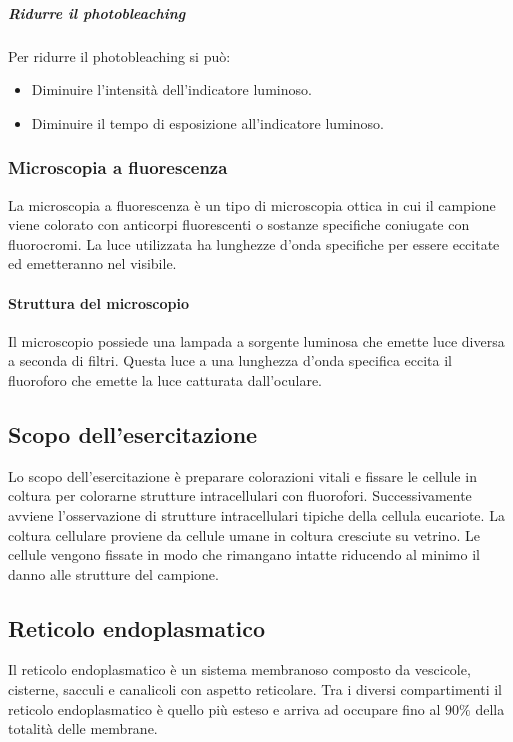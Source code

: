 				\subparagraph{Ridurre il photobleaching}
				Per ridurre il photobleaching si pu\`o:
				\begin{itemize}
					\item Diminuire l'intensit\`a dell'indicatore luminoso.
					\item Diminuire il tempo di esposizione all'indicatore luminoso.
				\end{itemize}

		\subsubsection{Microscopia a fluorescenza}
		La microscopia a fluorescenza \`e un tipo di microscopia ottica in cui il campione viene colorato con anticorpi fluorescenti o sostanze specifiche coniugate con fluorocromi.
		La luce utilizzata ha lunghezze d'onda specifiche per essere eccitate ed emetteranno nel visibile.

			\paragraph{Struttura del microscopio}
			Il microscopio possiede una lampada a sorgente luminosa che emette luce diversa a seconda di filtri.
			Questa luce a una lunghezza d'onda specifica eccita il fluoroforo che emette la luce catturata dall'oculare.

	\subsection{Scopo dell'esercitazione}
	Lo scopo dell'esercitazione \`e preparare colorazioni vitali e fissare le cellule in coltura per colorarne strutture intracellulari con fluorofori.
	Successivamente avviene l'osservazione di strutture intracellulari tipiche della cellula eucariote.
	La coltura cellulare proviene da cellule umane in coltura cresciute su vetrino.
	Le cellule vengono fissate in modo che rimangano intatte riducendo al minimo il danno alle strutture del campione.

	\subsection{Reticolo endoplasmatico}
	Il reticolo endoplasmatico \`e un sistema membranoso composto da vescicole, cisterne, sacculi e canalicoli con aspetto reticolare.
	Tra i diversi compartimenti il reticolo endoplasmatico \`e quello pi\`u esteso e arriva ad occupare fino al $90\%$ della totalit\`a delle membrane.

